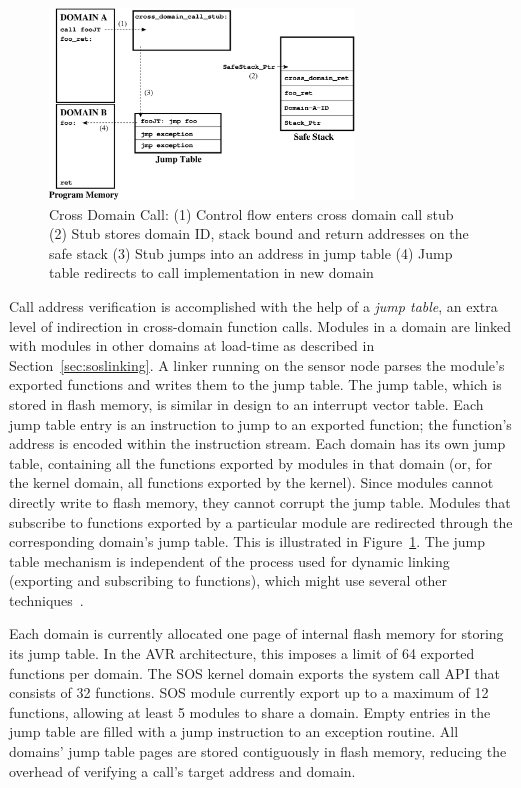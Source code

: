 \begin{figure}[htbp]
   \centering
   \includegraphics[height=2.0in, keepaspectratio=true]{figures/cross_domain_call_step.eps} 
   \caption[Cross domain call operation]{Cross Domain Call: (1) Control flow enters cross domain
     call stub (2) Stub stores domain ID, stack bound and return
     addresses on the safe stack (3) Stub jumps into an address in
     jump table (4) Jump table redirects to call implementation in new
   domain}
   \label{fig:cross_domain_call}
\end{figure}


%
Call address verification is accomplished with the help of a \emph{jump
table}, an extra level of indirection in cross-domain function calls.
%
%
Modules in a domain are linked with modules in other domains at
load-time as described in Section~\ref{sec:soslinking}.
%
A linker running on the sensor node parses the module's exported functions
and writes them to the jump table.
%
The jump table, which is stored in flash memory, is similar in design
to an interrupt vector table.
%
Each jump table entry is an instruction to jump to an exported
function;
%
the function's address is encoded within the instruction stream.
%
Each domain has its own jump table, containing all the functions exported
by modules in that domain (or, for the kernel domain, all functions
exported by the kernel).
%
Since modules cannot directly write to flash memory, they cannot
corrupt the jump table.
%
Modules that subscribe to functions exported by a particular module
are redirected through the corresponding domain's jump table.
%
This is illustrated in Figure~\ref{fig:cross_domain_call}.
%
The jump table mechanism is independent of the process used for
dynamic linking (exporting and subscribing to functions), which might use
several other techniques~\cite{dunkels06linking}.
%

Each domain is currently allocated one page of internal flash memory for
storing its jump table.
%
%
In the AVR architecture, this imposes a limit of 64 exported functions per
domain.
%
The SOS kernel domain exports the system call API that consists of 32
functions.
%
SOS module currently export up to a maximum of 12 functions, allowing
at least 5 modules to share a domain.
%
Empty entries in the jump table are filled with a jump instruction to an
exception routine.
%
All domains' jump table pages are stored contiguously in flash memory,
reducing the overhead of verifying a call's target address and domain.



